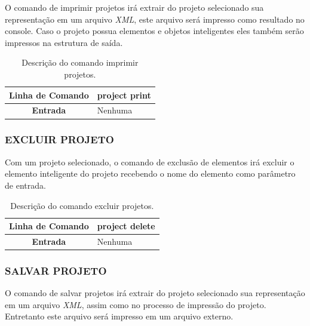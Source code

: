 \documentclass[a4paper,12pt]{monografia}
\theoremstyle{plain}
\theoremstyle{definition}
\theoremstyle{remark}
\begin{document}
O comando de imprimir projetos irá extrair do projeto selecionado sua representação em um arquivo \textit{XML}, este arquivo será impresso como resultado no console. Caso o projeto possua elementos e objetos inteligentes eles também serão impressos na estrutura de saída.

\begin{center}
\begin{table}[!htbp]
	\begin{tabular}{|c|m{}|}
		\hline
		\textbf{Linha de Comando} & \multicolumn{1}{c|}{project print} \\
		\hline
		\textbf{Entrada} & Nenhuma \\
		\hline
	\end{tabular}
	\caption{Descrição do comando imprimir projetos.}
	\label{tab:print_projects}
\end{table}
\end{center}

\subsubsection{EXCLUIR PROJETO}\label{sec:delete_projects}

Com um projeto selecionado, o comando de exclusão de elementos irá excluir o elemento inteligente do projeto recebendo o nome do elemento como parâmetro de entrada.

\begin{center}
\begin{table}[!htbp]
	\begin{tabular}{|c|m{}|}
		\hline
		\textbf{Linha de Comando} & \multicolumn{1}{c|}{project delete} \\
		\hline
		\textbf{Entrada} & Nenhuma \\
		\hline
	\end{tabular}
	\caption{Descrição do comando excluir projetos.}
	\label{tab:delete_projects}
\end{table}
\end{center}

\subsubsection{SALVAR PROJETO}\label{sec:save_projects}

O comando de salvar projetos irá extrair do projeto selecionado sua representação em um arquivo \textit{XML}, assim como no processo de impressão do projeto. Entretanto este arquivo será impresso em um arquivo externo.
\end{document}
